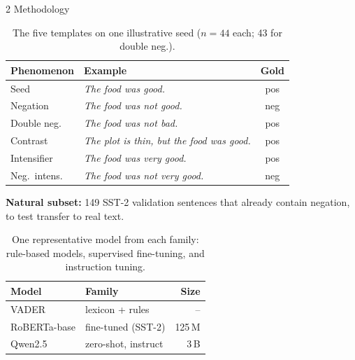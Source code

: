 \documentclass[final]{beamer}
\newlength{\colwidth}
\begin{document}
\begin{frame}[t]
\begin{columns}[t]
\begin{column}{\colwidth}
\begin{block}{2 \textbullet{} Methodology}
\begin{center}
\end{center}

\begin{table}
\begin{tabularx}{\linewidth}{@{}lXc@{}}
\toprule
\textbf{Phenomenon} & \textbf{Example} & \textbf{Gold}\\
\midrule
Seed          & \emph{The food was good.}              & pos\\
Negation      & \emph{The food was not good.}          & neg\\
Double neg.   & \emph{The food was not bad.}           & pos\\
Contrast      & \emph{The plot is thin, but the food was good.} & pos\\
Intensifier   & \emph{The food was very good.}         & pos\\
Neg.\ intens. & \emph{The food was not very good.}     & neg\\
\bottomrule
\end{tabularx}
\caption{The five templates on one illustrative seed ($n = 44$ each; 43 for double neg.).}
\end{table}
\textbf{Natural subset:} 149 SST-2 validation sentences that already contain negation, to test transfer to real text.

\begin{table}
\begin{tabularx}{\linewidth}{@{}Xlr@{}}
\toprule
\textbf{Model} & \textbf{Family} & \textbf{Size}\\
\midrule
VADER        & lexicon + rules    & --\\
RoBERTa-base & fine-tuned (SST-2) & 125\,M\\
Qwen2.5      & zero-shot, instruct & 3\,B\\
\bottomrule
\end{tabularx}
\caption{One representative model from each family: rule-based models, supervised fine-tuning, and instruction tuning.}
\end{table}


\end{block}
\end{column}
\end{columns}
\end{frame}
\end{document}
